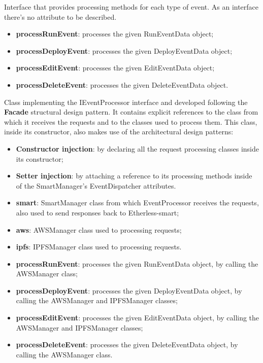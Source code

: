 	Interface that provides processing methods for each type of event.
	As an interface there's no attribute to be described.
	\begin{itemize}
		\item \textbf{processRunEvent}: processes the given RunEventData object;
		\item \textbf{processDeployEvent}: processes the given DeployEventData object;
		\item \textbf{processEditEvent}: processes the given EditEventData object;
		\item \textbf{processDeleteEvent}: processes the given DeleteEventData object.
	\end{itemize}
	Class implementing the IEventProcessor interface and developed following the \textbf{Facade} structural design pattern. It contains explicit references to the class from which it receives the requests and to the classes used to process them. This class, inside its constructor, also makes use of the architectural design patterns: 
	\begin{itemize}
		\item \textbf{Constructor injection}: by declaring all the request processing classes inside its constructor;
		\item \textbf{Setter injection}: by attaching a reference to its processing methods inside of the SmartManager's EventDispatcher attributes.
	\end{itemize} 
	\begin{itemize}
		\item \textbf{smart}: SmartManager class from which EventProcessor receives the requests, also used to send responses back to Etherless-smart;
		\item \textbf{aws}: AWSManager class used to processing requests;
		\item \textbf{ipfs}: IPFSManager class used to processing requests. 
	\end{itemize}
	\begin{itemize}
		\item \textbf{processRunEvent}: processes the given RunEventData object, by calling the AWSManager class;
		\item \textbf{processDeployEvent}: processes the given DeployEventData object, by calling the AWSManager and IPFSManager classes;
		\item \textbf{processEditEvent}: processes the given EditEventData object, by calling the AWSManager and IPFSManager classes;
		\item \textbf{processDeleteEvent}: processes the given DeleteEventData object, by calling the AWSManager class.
	\end{itemize}
